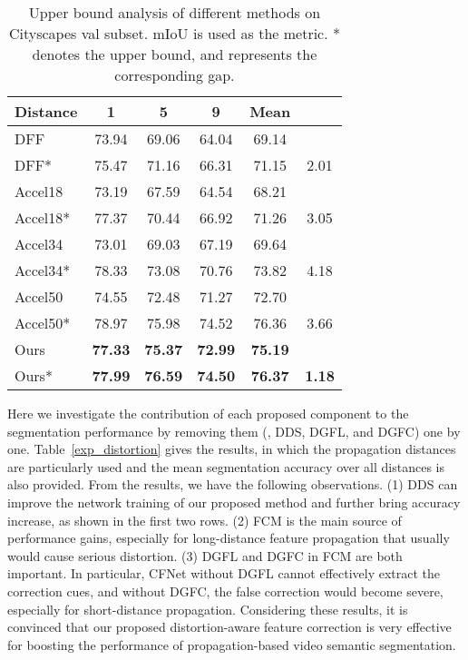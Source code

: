 \documentclass[journal]{IEEEtran}
\begin{document}
\begin{table}[t]
	\caption{Upper bound analysis of different methods on Cityscapes val subset. mIoU is used as the metric. * denotes the upper bound, and  represents the corresponding gap.}
	\begin{center}
		\renewcommand{\arraystretch}{1.3}
		\begin{tabular}{l|c|c|c|c|c}
			\hline
			Distance            & 1				& 5				& 9 			& Mean   		&    	\\
			\hline
			DFF          		& 73.94			& 69.06 		& 64.04 		& 69.14			&				\\
			DFF*	 			& 75.47			& 71.16			& 66.31			& 71.15 		& 2.01			\\
			\hline
			Accel18 			& 73.19			& 67.59			& 64.54			& 68.21			&				\\
			Accel18* 			& 77.37			& 70.44			& 66.92			& 71.26 		& 3.05			\\
			\hline
			Accel34 			& 73.01			& 69.03			& 67.19			& 69.64			&				\\
			Accel34* 			& 78.33			& 73.08			& 70.76			& 73.82			& 4.18			\\
			\hline
			Accel50 			& 74.55			& 72.48			& 71.27			& 72.70			&				\\
			Accel50* 			& 78.97			& 75.98			& 74.52			& 76.36			& 3.66			\\
			\hline
			Ours 				& \bf{77.33}	& \bf{75.37}	& \bf{72.99}	& \bf{75.19}	&				\\
			Ours*	 			& \bf{77.99}	& \bf{76.59}	& \bf{74.50}	& \bf{76.37}	& \bf{1.18}		\\
			\hline
		\end{tabular}
	\end{center}
	\label{exp_upper_bound}
\end{table}

Here we investigate the contribution of each proposed component to the segmentation performance by removing them (\ie, DDS, DGFL, and DGFC) one by one. Table~\ref{exp_distortion} gives the results, in which the propagation distances  are particularly used and the mean segmentation accuracy over all distances is also provided.
From the results, we have the following observations. (1) DDS can improve the network training of our proposed method and further bring accuracy increase, as shown in the first two rows.  (2) FCM is the main source of performance gains, especially for long-distance feature propagation that usually would cause serious distortion. (3) DGFL and DGFC in FCM are both important. In particular, CFNet without DGFL cannot effectively extract the correction cues, and without DGFC, the false correction would become severe, especially for short-distance propagation. 
Considering these results, it is convinced that our proposed distortion-aware feature correction is very effective for boosting the performance of propagation-based video semantic segmentation.
\end{document}

